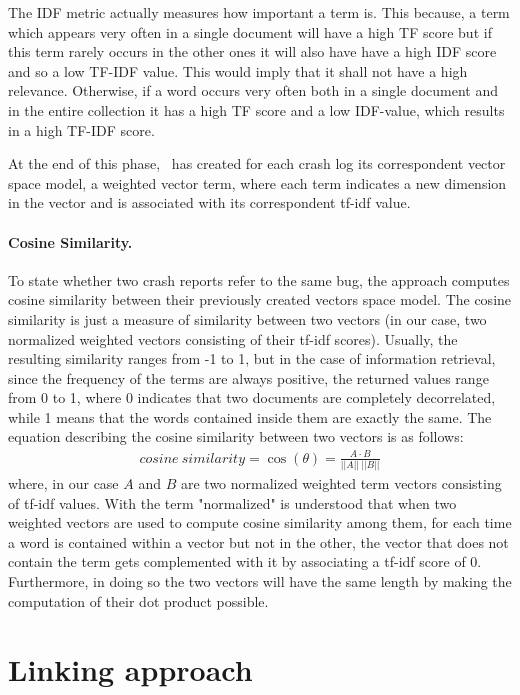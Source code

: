 The IDF metric actually measures how important a term is. This because, a term which appears very often in a single document will have a high TF score but if this term rarely occurs in the other ones it will also have have a high IDF score and so a low TF-IDF value. This would imply that it shall not have a high relevance. Otherwise, if a word occurs very often both in a single document and in the entire collection it has a high TF score and a low IDF-value, which results in a high TF-IDF score.

At the end of this phase, \toolname\ has created for each crash log its correspondent vector space model, \ie a weighted vector term, where each term indicates a new dimension in the vector and is associated with its correspondent tf-idf value. 


\paragraph{Cosine Similarity.}
To state whether two crash reports refer to the same bug, the approach computes cosine similarity between their previously created vectors space model. 
The cosine similarity is just a measure of similarity between two vectors \cite{cosine} (in our case, two normalized weighted vectors consisting of their tf-idf scores).
Usually, the resulting similarity ranges from -1 to 1, but in the case of information retrieval, since the frequency of the terms are always positive, the returned values range from 0 to 1, where 0 indicates that two documents are completely decorrelated, while 1 means that the words contained inside them are exactly the same.  
The equation describing the cosine similarity between two vectors is as follows: 
\begin{align*}
cosine\:similarity = \cos({\theta}) = \frac{A\cdot{B}}{||A||\:||B||}
\end{align*}
where, in our case $A$ and $B$ are two normalized weighted term vectors consisting of tf-idf values. 
With the term "normalized" is understood that when two weighted vectors are used to compute cosine similarity among them, for each time a word is contained within a vector but not in the other, the vector that does not contain the term gets complemented with it by associating a tf-idf score of 0. Furthermore, in doing so the two vectors will have the same length by making the computation of their dot product possible. 



\section{Linking approach}
\label{approach:linking}


